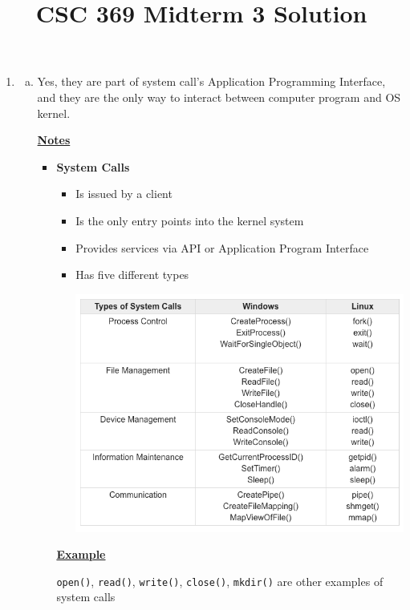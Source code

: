 \documentclass[12pt]{article}
\begin{document}
\title{CSC 369 Midterm 3 Solution}

\bigskip

\begin{enumerate}[1.]
    \item

    \begin{enumerate}[a)]

        \item
        Yes, they are part of system call's Application Programming Interface,
        and they are the only way to interact between computer program and OS kernel.
        \bigskip

        \underline{\textbf{Notes}}

        \begin{itemize}
            \item \textbf{System Calls}
            \begin{itemize}
                \item Is issued by a client
                \item Is the only entry points into the kernel system
                \item Provides services via API or Application Program Interface
                \item Has five different types

                \begin{center}
                \includegraphics[width=0.7\linewidth]{../images/midterm_3_solution_1.png}
                \end{center}
            \end{itemize}

            \bigskip

            \underline{\textbf{Example}}

            \bigskip

            \texttt{open()}, \texttt{read()}, \texttt{write()}, \texttt{close()}, \texttt{mkdir()} are other examples of system calls
        \end{itemize}


\end{enumerate}
\end{enumerate}
\end{document}
